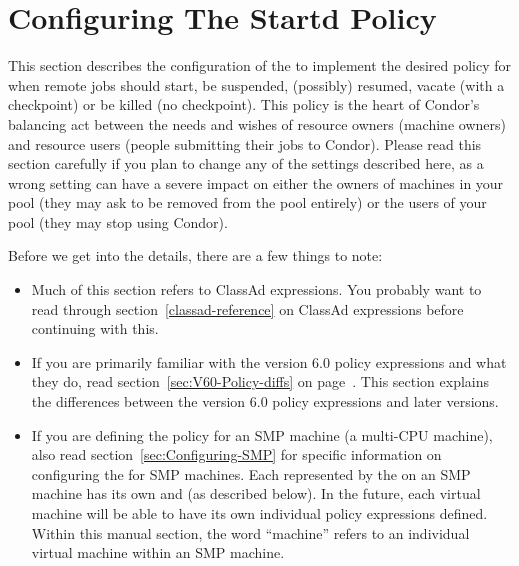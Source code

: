 
\section{\label{sec:Configuring-Policy}
Configuring The Startd Policy}

This section describes the configuration of the  to
implement the desired policy for when remote jobs should start, be
suspended, (possibly) resumed, vacate (with a checkpoint) or be killed
(no checkpoint).
This policy is the heart of Condor's balancing act
between the needs and wishes of resource owners (machine owners) and
resource users (people submitting their jobs to Condor).
Please read
this section carefully if you plan to change any of the settings
described here, as a wrong setting can have a severe impact on
either the owners of machines in your pool (they may
ask to be removed from the pool entirely) or the users of your pool
(they may stop using Condor).

Before we get into the details, there are a few things to note:
\begin{itemize}
\item Much of this section refers to ClassAd expressions.  You
probably want to read through section~\ref{classad-reference} on
ClassAd expressions before continuing with this.

\item If you are primarily familiar with the version 6.0 policy
expressions and what they do, read
section~\ref{sec:V60-Policy-diffs} on
page~\pageref{sec:V60-Policy-diffs}.  This section explains the differences
between the version 6.0 policy expressions and later versions.  

\item If you are defining the policy for an SMP machine
(a multi-CPU machine),
also read section~\ref{sec:Configuring-SMP} for specific information on
configuring the  for SMP machines.  
Each  represented by the  on an
SMP machine has its own  and 
(as described below). 
In the future, each virtual machine will be able to have its
own individual policy expressions defined.
Within this manual section, the word ``machine''
refers to an individual virtual machine within
an SMP machine.
\end{itemize}

